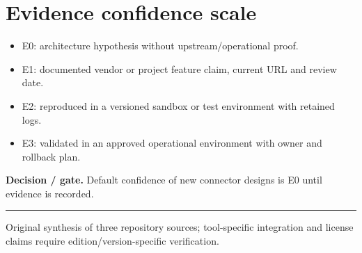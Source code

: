 \documentclass[10pt,letterpaper]{article}
\begin{document}
\section{Evidence confidence scale}
\begin{itemize}
\item E0: architecture hypothesis without upstream/operational proof.
\item E1: documented vendor or project feature claim, current URL and review date.
\item E2: reproduced in a versioned sandbox or test environment with retained logs.
\item E3: validated in an approved operational environment with owner and rollback plan.
\end{itemize}
\textbf{Decision / gate.} Default confidence of new connector designs is E0 until evidence is recorded.\par
\vfill\noindent\color{muted}\rule{\linewidth}{0.4pt}\par\scriptsize Original synthesis of three repository sources; tool-specific integration and license claims require edition/version-specific verification.\normalsize
\end{document}
